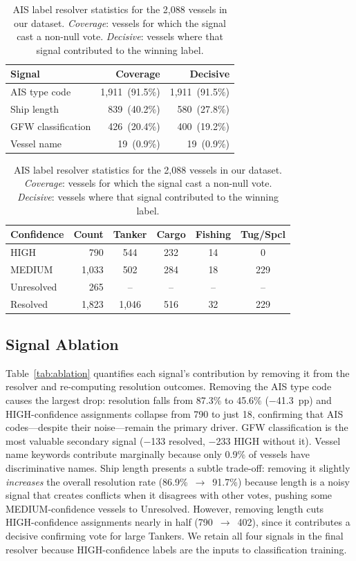 \documentclass[journal]{IEEEtran}
\begin{document}
\begin{table}[t]
\centering
\caption{AIS label resolver statistics for the 2,088 vessels in our dataset.
\textit{Coverage}: vessels for which the signal cast a non-null vote.
\textit{Decisive}: vessels where that signal contributed to the winning label.}
\label{tab:resolver}
\begin{tabular}{@{}lrr@{}}
\toprule
Signal & Coverage & Decisive \\
\midrule
AIS type code      & 1,911~(91.5\%) & 1,911~(91.5\%) \\
Ship length        &   839~(40.2\%) &   580~(27.8\%) \\
GFW classification &   426~(20.4\%) &   400~(19.2\%) \\
Vessel name        &    19~(0.9\%)  &    19~(0.9\%)  \\
\bottomrule
\end{tabular}
\vspace{4pt}
\begin{tabular}{@{}lrcccc@{}}
\toprule
Confidence & Count & Tanker & Cargo & Fishing & Tug/Spcl \\
\midrule
HIGH       &    790 & 544 & 232 &  14 &   0 \\
MEDIUM     & 1,033  & 502 & 284 &  18 & 229 \\
Unresolved &    265 &  -- &  -- &  -- &  -- \\
\midrule
Resolved   & 1,823  & 1,046 & 516 & 32 & 229 \\
\bottomrule
\end{tabular}
\end{table}

\subsection{Signal Ablation}

Table~\ref{tab:ablation} quantifies each signal's contribution by removing
it from the resolver and re-computing resolution outcomes.
Removing the AIS type code causes the largest drop: resolution falls from
87.3\% to 45.6\% ($-$41.3~pp) and HIGH-confidence assignments collapse from
790 to just 18, confirming that AIS codes---despite their noise---remain
the primary driver.
GFW classification is the most valuable secondary signal ($-$133 resolved,
$-$233 HIGH without it).
Vessel name keywords contribute marginally because only 0.9\% of vessels
have discriminative names.
Ship length presents a subtle trade-off: removing it slightly \textit{increases}
the overall resolution rate (86.9\%~$\to$~91.7\%) because length is a noisy
signal that creates conflicts when it disagrees with other votes, pushing
some MEDIUM-confidence vessels to Unresolved.
However, removing length cuts HIGH-confidence assignments nearly in half
(790~$\to$~402), since it contributes a decisive confirming vote for
large Tankers.
We retain all four signals in the final resolver because HIGH-confidence
labels are the inputs to classification training.
\end{document}
